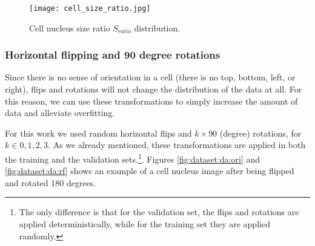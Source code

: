 \begin{figure}[htb]
  \centering
  \texttt{[image: cell\_size\_ratio.jpg]}
  \caption{Cell nucleus size ratio $S_{ratio}$ distribution.}
  \label{fig:dataset:da:cs_dist}
\end{figure}

\subsubsection{Horizontal flipping and 90 degree rotations}

Since there is no sense of orientation in a cell (there is no top, bottom, left, or right), flips and rotations will not change the distribution of the data at all. For this reason, we can use these transformations to simply increase the amount of data and alleviate overfitting.

For this work we used random horizontal flips and $k\times90$ (degree) rotations, for $k\in{0, 1, 2, 3}$. As we already mentioned, these transformations are applied in both the training and the validation sets.\footnote{The only difference is that for the validation set, the flips and rotations are applied deterministically, while for the training set they are applied randomly.}. Figures \ref{fig:dataset:da:ori} and \ref{fig:dataset:da:rf} shows an example of a cell nucleus image after being flipped and rotated 180 degrees.

